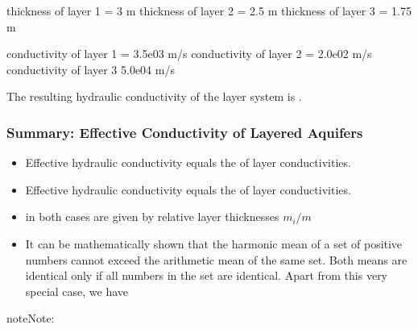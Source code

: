 \documentclass[letterpaper,10pt,english]{sphinxmanual}
\begin{document}
\begin{sphinxVerbatim}[commandchars=\\\{\}]
thickness of layer 1 = 3 m
thickness of layer 2 = 2.5 m
thickness of layer 3 = 1.75 m

conductivity of layer 1 = 3.5e\PYGZhy{}03 m/s
conductivity of layer 2 = 2.0e\PYGZhy{}02 m/s
conductivity of layer 3 5.0e\PYGZhy{}04 m/s

The resulting hydraulic conductivity of the layer system is .
\end{sphinxVerbatim}


\subsubsection{Summary: Effective Conductivity of Layered Aquifers}
\label{\detokenize{contents/flow/lecture_05/15_het_iso:summary-effective-conductivity-of-layered-aquifers}}\begin{itemize}
\item {} 
Effective hydraulic conductivity equals the  of layer conductivities.

\item {} 
Effective hydraulic conductivity equals the  of layer conductivities.

\item {} 
 in both cases are given by relative layer thicknesses \(m_i/m\)

\item {} 
It can be mathematically shown that the harmonic mean of a set of
positive numbers cannot exceed the arithmetic mean of the same set. Both means are identical only if all numbers in the set are identical.
Apart from this very special case, we have

\end{itemize}

\begin{sphinxadmonition}{note}{Note:}\begin{quote}

\end{quote}
\end{sphinxadmonition}
\end{document}

